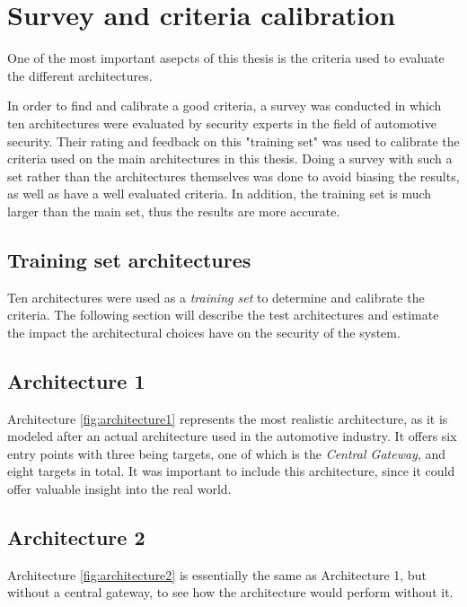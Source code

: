\chapter{Survey and criteria calibration}
\label{chp:introcriteria}

One of the most important asepcts of this thesis is the criteria used to evaluate the different architectures.

In order to find and calibrate a good criteria, a survey was conducted in which ten architectures were evaluated by security experts in the field of automotive security.
Their rating and feedback on this "training set" was used to calibrate the criteria used on the main architectures in this thesis.
Doing a survey with such a set rather than the architectures themselves was done to avoid biasing the results, as well as have a well evaluated criteria.
In addition, the training set is much larger than the main set, thus the results are more accurate.

\section{Training set architectures}
\label{sec:trainingarch}

Ten architectures were used as a \textit{training set} to determine and calibrate the criteria.
The following section will describe the test architectures and estimate the impact the architectural choices have on the security of the system.

\section{Architecture 1}
\label{subsec:arch1}

Architecture \ref{fig:architecture1} represents the most realistic architecture, 
as it is modeled after an actual architecture used in the automotive industry. 
It offers six entry points with three being targets, one of which is the \textit{Central Gateway}, and eight targets in total. 
It was important to include this architecture, since it could offer valuable insight into the real world.

\section{Architecture 2}
\label{subsec:arch2}

Architecture \ref{fig:architecture2} is essentially the same as Architecture 1, 
but without a central gateway, to see how the architecture would perform without it.

